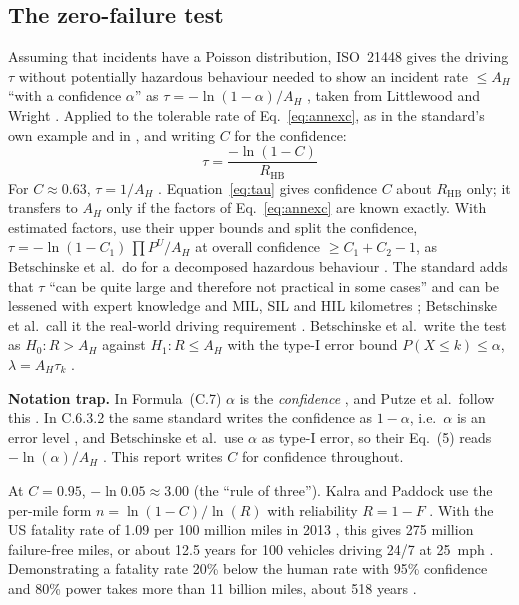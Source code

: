 \documentclass[11pt,a4paper]{article}
\newcommand{\RHB}{R_{\mathrm{HB}}}
\begin{document}
\subsection{The zero-failure test}
Assuming that incidents have a Poisson distribution, ISO~21448 gives the driving $\tau$ without potentially hazardous behaviour needed to show an incident rate $\le A_H$ ``with a confidence $\alpha$'' as $\tau=-\ln(1-\alpha)/A_H$ \cite[C.3, Example~3 and Formula~(C.7), p.~137]{iso21448}, taken from Littlewood and Wright \cite{littlewood1997}. Applied to the tolerable rate of Eq.~\eqref{eq:annexc}, as in the standard's own example \cite[C.2.1, p.~127]{iso21448} and in \cite[Sec.~IV-B(a)]{putze2023}, and writing $C$ for the confidence:
\begin{equation}
\tau = \frac{-\ln(1-C)}{\RHB}
\label{eq:tau}
\end{equation}
For $C\approx0.63$, $\tau = 1/A_H$ \cite[C.3, Note~2, p.~137]{iso21448}. Equation~\eqref{eq:tau} gives confidence $C$ about $\RHB$ only; it transfers to $A_H$ only if the factors of Eq.~\eqref{eq:annexc} are known exactly. With estimated factors, use their upper bounds and split the confidence, $\tau=-\ln(1-C_1)\,\prod P^{U}/A_H$ at overall confidence $\ge C_1+C_2-1$, as Betschinske et al.\ do for a decomposed hazardous behaviour \cite[Sec.~V, Eq.~(9)]{betschinske2025}. The standard adds that $\tau$ ``can be quite large and therefore not practical in some cases'' and can be lessened with expert knowledge and MIL, SIL and HIL kilometres \cite[C.3, p.~137]{iso21448}; Betschinske et al.\ call it the real-world driving requirement \cite[Sec.~III-C, item~5, Eq.~(5)]{betschinske2025}. Betschinske et al.\ write the test as $H_0\!: R > A_H$ against $H_1\!: R\le A_H$ with the type-I error bound $P(X\le k)\le\alpha$, $\lambda = A_H\tau_k$ \cite[Sec.~III-C, Eqs.~(3)--(4)]{betschinske2025}.

\textbf{Notation trap.} In Formula~(C.7) $\alpha$ is the \emph{confidence} \cite[C.3, p.~137]{iso21448}, and Putze et al.\ follow this \cite[Sec.~IV-B(a)]{putze2023}. In C.6.3.2 the same standard writes the confidence as $1-\alpha$, i.e.\ $\alpha$ is an error level \cite[C.6.3.2, Example~1, p.~156]{iso21448}, and Betschinske et al.\ use $\alpha$ as type-I error, so their Eq.~(5) reads $-\ln(\alpha)/A_H$ \cite[Sec.~III-C, Eq.~(5)]{betschinske2025}. This report writes $C$ for confidence throughout.

At $C=0.95$, $-\ln 0.05\approx 3.00$ (the ``rule of three''). Kalra and Paddock use the per-mile form $n=\ln(1-C)/\ln(R)$ with reliability $R=1-F$ \cite[Sec.~1, p.~3, Eq.~2]{kalra2016}. With the US fatality rate of 1.09 per 100 million miles in 2013 \cite[Introduction, p.~2]{kalra2016}, this gives 275 million failure-free miles, or about 12.5 years for 100 vehicles driving 24/7 at 25~mph \cite[Sec.~1, p.~3; Table~1, p.~10]{kalra2016}. Demonstrating a fatality rate 20\% below the human rate with 95\% confidence and 80\% power takes more than 11 billion miles, about 518 years \cite[Sec.~3, p.~8]{kalra2016}.
\end{document}
